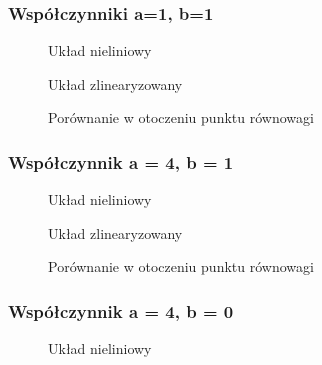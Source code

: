 \documentclass[a4paper, 10pt]{article}
\begin{document}
			\subsubsection{Współczynniki a=1, b=1}
				\begin{figure}[H]
					\centering
					\def \svgwidth{0.75\columnwidth}
					
					\caption{Układ nieliniowy}
				\end{figure}\noindent


				\begin{figure}[H]
					\centering
					\def \svgwidth{0.75\columnwidth}
					
					\caption{Układ zlinearyzowany}
				\end{figure}\noindent


				\begin{figure}[H]
					\centering
					\def \svgwidth{0.75\columnwidth}
					
					\caption{Porównanie w otoczeniu punktu równowagi}
				\end{figure}\noindent

			\subsubsection{Współczynnik a = 4, b = 1}
				\begin{figure}[H]
					\centering
					\def \svgwidth{0.75\columnwidth}
					
					\caption{Układ nieliniowy}
				\end{figure}\noindent


				\begin{figure}[H]
					\centering
					\def \svgwidth{0.75\columnwidth}
					
					\caption{Układ zlinearyzowany}
				\end{figure}\noindent



				\begin{figure}[H]
					\centering
					\def \svgwidth{0.75\columnwidth}
					
					\caption{Porównanie w otoczeniu punktu równowagi}
				\end{figure}\noindent

			\subsubsection{Współczynnik a = 4, b = 0}
				\begin{figure}[H]
					\centering
					\def \svgwidth{0.75\columnwidth}
					
					\caption{Układ nieliniowy}
				\end{figure}\noindent
\end{document}
